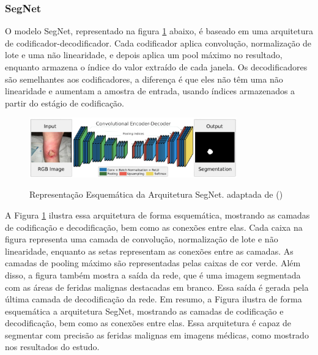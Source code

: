     
    \subsubsection{SegNet}

        O modelo \ac{SegNet}, representado na figura \ref{fig:arquiteturaSegNet} abaixo,  é baseado em uma arquitetura de codificador-decodificador. Cada codificador aplica convolução, normalização de lote e uma não linearidade, e depois aplica um pool máximo no resultado, enquanto armazena o índice do valor extraído de cada janela. Os decodificadores são semelhantes aos codificadores, a diferença é que eles não têm uma não linearidade e aumentam a amostra de entrada, usando índices armazenados a partir do estágio de codificação. 

        \begin{figure}[htbp]
            \centering
            \caption{Representação Esquemática da Arquitetura \ac{SegNet}. adaptada de (\cite{badrinarayanan2017deep})}
            \includegraphics[width=0.8\textwidth]{img/arquitetura_Seg-Net.png}
            \label{fig:arquiteturaSegNet}
        \end{figure}

            A Figura \ref{fig:arquiteturaSegNet} ilustra essa arquitetura de forma esquemática, mostrando as camadas de codificação e decodificação, bem como as conexões entre elas. Cada caixa na figura representa uma camada de convolução, normalização de lote e não linearidade, enquanto as setas representam as conexões entre as camadas. As camadas de pooling máximo são representadas pelas caixas de cor verde. Além disso, a figura também mostra a saída da rede, que é uma imagem segmentada com as áreas de feridas malignas destacadas em branco. Essa saída é gerada pela última camada de decodificação da rede.
            Em resumo, a Figura ilustra de forma esquemática a arquitetura \ac{SegNet}, mostrando as camadas de codificação e decodificação, bem como as conexões entre elas. Essa arquitetura é capaz de segmentar com precisão as feridas malignas em imagens médicas, como mostrado nos resultados do estudo.

    \clearpage
    
